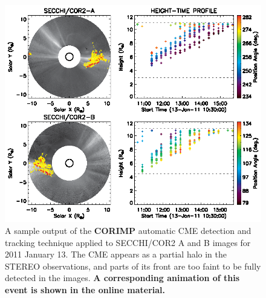 \documentclass[preprint2]{aastex}
\begin{document}
\begin{figure}[!t]
\centerline{\includegraphics[scale=1, clip=true, trim=0 0 0 0]{figure_events_secchi.eps}}
\caption{A sample output of the {\bf CORIMP} automatic CME detection and tracking technique applied to SECCHI/COR2 A and B images for 2011 January 13. The CME appears as a partial halo in the STEREO observations, and parts of its front are too faint to be fully detected in the images. {\bf A corresponding animation of this event is shown in the online material.}}
\label{figure_events_secchi}
\end{figure}
\end{document}
